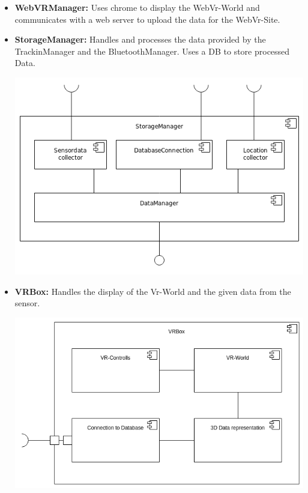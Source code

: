 \begin{itemize}
  \item \textbf{WebVRManager:} Uses chrome to display the WebVr-World and communicates with a web server to upload the data for the WebVr-Site.
  \item \textbf{StorageManager:} Handles and processes the data provided by the TrackinManager and the BluetoothManager. Uses a DB to store processed Data.
  \begin{center}
  	\includegraphics[scale=0.4]{pics/StorageMgr_Composition.png}
  \end{center}
  \item \textbf{VRBox:} Handles the display of the Vr-World and the given data from the sensor.
  \begin{center}
	\includegraphics[scale=0.35]{pics/VRBox.png}
  \end{center}
\end{itemize}


